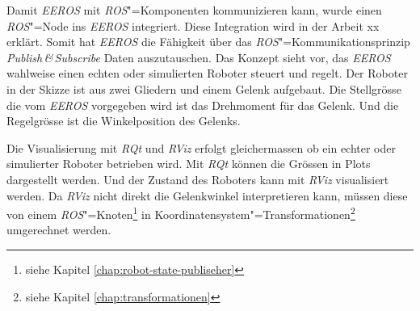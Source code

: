 Damit \textit{EEROS} mit \textit{ROS}"=Komponenten kommunizieren kann, wurde einen \textit{ROS}"=Node ins \textit{EEROS} integriert.
Diese Integration wird in der Arbeit xx erklärt. %
Somit hat \textit{EEROS} die Fähigkeit über das \textit{ROS}"=Kommunikationsprinzip \textit{Publish\,\&\,Subscribe} Daten auszutauschen.
Das Konzept sieht vor, das \textit{EEROS} wahlweise einen echten oder simulierten Roboter steuert und regelt.
Der Roboter in der Skizze ist aus zwei Gliedern und einem Gelenk aufgebaut.
Die Stellgrösse die vom \textit{EEROS} vorgegeben wird ist das Drehmoment für das Gelenk.
Und die Regelgrösse ist die Winkelposition des Gelenks.

Die Visualisierung mit \textit{RQt} und \textit{RViz} erfolgt gleichermassen ob ein echter oder simulierter Roboter betrieben wird.
Mit \textit{RQt} können die Grössen in Plots dargestellt werden.
Und der Zustand des Roboters kann mit \textit{RViz} visualisiert werden.
Da \textit{RViz} nicht direkt die Gelenkwinkel interpretieren kann, müssen diese von einem \textit{ROS}"=Knoten\footnote{siehe Kapitel \ref{chap:robot-state-publiseher}} in Koordinatensystem"=Transformationen\footnote{siehe Kapitel \ref{chap:transformationen}} umgerechnet werden.






